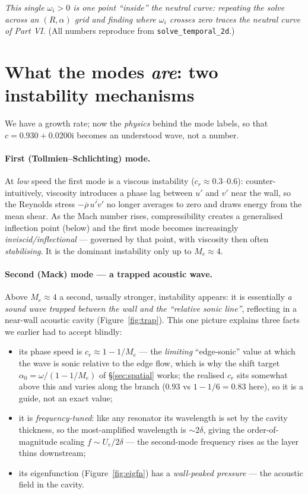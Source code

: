 \documentclass[11pt]{article}
\newcommand{\imag}{\mathrm{i}}
\newcommand{\Mae}{M_e}
\renewcommand{\bar}[1]{\overline{#1}}
\begin{document}
\emph{This single $\omega_i>0$ is one point ``inside'' the neutral curve: repeating the solve across an
$(R,\alpha)$ grid and finding where $\omega_i$ crosses zero traces the neutral curve of Part VI.} (All
numbers reproduce from \texttt{solve\_temporal\_2d}.)

\section{What the modes \emph{are}: two instability mechanisms}\label{sec:mechanisms}
We have a growth rate; now the \emph{physics} behind the mode labels, so that $c=0.930+0.0200\imag$ becomes an
understood wave, not a number.

\paragraph{First (Tollmien--Schlichting) mode.} At \emph{low} speed the first mode is a viscous instability
($c_r\!\approx\!0.3$--$0.6$): counter-intuitively, viscosity introduces a phase lag between $u'$ and $v'$ near
the wall, so the Reynolds stress $-\bar\rho\,\overline{u'v'}$ no longer averages to zero and draws energy from
the mean shear. As the Mach number rises, compressibility creates a generalised inflection point (below) and
the first mode becomes increasingly \emph{inviscid/inflectional} --- governed by that point, with viscosity
then often \emph{stabilising}. It is the dominant instability only up to $\Mae\!\approx\!4$.

\paragraph{Second (Mack) mode --- a trapped acoustic wave.} Above $\Mae\!\approx\!4$ a second, usually
stronger, instability appears: it is essentially \emph{a sound wave trapped between the wall and the
``relative sonic line''}, reflecting in a near-wall acoustic cavity (Figure~\ref{fig:trap}). This one picture
explains three facts we earlier had to accept blindly:
\begin{itemize}[nosep,leftmargin=1.6em]
  \item its phase speed is $c_r\!\approx\!1-1/\Mae$ --- the \emph{limiting} ``edge-sonic'' value at which the
        wave is sonic relative to the edge flow, which is why the shift target $\alpha_0=\omega/(1-1/\Mae)$ of
        \S\ref{sec:spatial} works; the realised $c_r$ sits somewhat above this and varies along the branch
        ($0.93$ vs $1-1/6=0.83$ here), so it is a guide, not an exact value;
  \item it is \emph{frequency-tuned}: like any resonator its wavelength is set by the cavity thickness, so the
        most-amplified wavelength is $\sim\!2\delta$, giving the order-of-magnitude scaling
        $f\!\sim\!U_e/2\delta$ --- the second-mode frequency rises as the layer thins downstream;
  \item its eigenfunction (Figure~\ref{fig:eigfn}) has a \emph{wall-peaked pressure} --- the acoustic field in
        the cavity.
\end{itemize}
\end{document}
